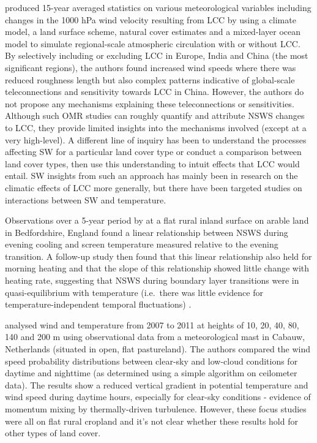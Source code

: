 \citet{zhao2002} produced 15-year averaged statistics on various meteorological variables including changes in the 1000 hPa wind velocity resulting from \ac{LCC} by using a climate model, a land surface scheme, natural cover estimates and a mixed-layer ocean model to simulate regional-scale atmospheric circulation with or without \ac{LCC}. By selectively including or excluding \ac{LCC} in Europe, India and China (the most significant regions), the authors found increased wind speeds where there was reduced roughness length but also complex patterns indicative of global-scale teleconnections and sensitivity towards \ac{LCC} in China. However, the authors do not propose any mechanisms explaining these teleconnections or sensitivities.
Although such \ac{OMR} studies can roughly quantify and attribute \ac{NSWS} changes to \ac{LCC}, they provide limited insights into the mechanisms involved (except at a very high-level). A different line of inquiry has been to understand the processes affecting SW for a particular land cover type or conduct a comparison between land cover types, then use this understanding to intuit effects that \ac{LCC} would entail. \ac{SW} insights from such an approach has mainly been in research on the climatic effects of \ac{LCC} more generally, but there have been targeted studies on interactions between \ac{SW} and temperature.

Observations over a 5-year period by \citet{lapworth2003} at a flat rural inland surface on arable land in Bedfordshire, England found a linear relationship between \ac{NSWS} during evening cooling and screen temperature measured relative to the evening transition. A follow-up study then found that this linear relationship also held for morning heating and that the slope of this relationship showed little change with heating rate, suggesting that \ac{NSWS} during boundary layer transitions were in quasi-equilibrium with temperature (i.e.\ there was little evidence for temperature-independent temporal fluctuations) \citep{lapworth2006}.

\citet{he2013} analysed wind and temperature from 2007 to 2011 at heights of 10, 20, 40, 80, 140 and 200 m using observational data from a meteorological mast in Cabauw, Netherlands (situated in open, flat pastureland). The authors compared the wind speed probability distributions between clear-sky and low-cloud conditions for daytime and nighttime (as determined using a simple algorithm on ceilometer data). The results show a reduced vertical gradient in potential temperature and wind speed during daytime hours, especially for clear-sky conditions - evidence of momentum mixing by thermally-driven turbulence. However, these focus studies were all on flat rural cropland and it’s not clear whether these results hold for other types of land cover.

